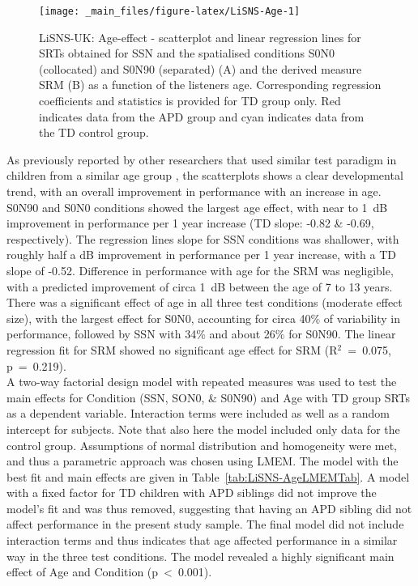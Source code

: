 \documentclass[a4paper, twoside]{templates/ociamthesis}
\begin{document}
\begin{figure}

{\centering \texttt{[image: \_main\_files/figure-latex/LiSNS-Age-1]} 

}

\caption{LiSNS-UK: Age-effect - scatterplot and linear regression lines for SRTs obtained for SSN and the spatialised conditions S0N0 (collocated) and S0N90 (separated) (A) and the derived measure SRM (B) as a function of the listeners age. Corresponding regression coefficients and statistics is provided for TD group only. Red indicates data from the APD group and cyan indicates data from the TD control group.}\label{fig:LiSNS-Age}
\end{figure}

As previously reported by other researchers that used similar test paradigm in children from a similar age group \autocites[e.g.,][]{Cameron2007,Murphy2019}, the scatterplots shows a clear developmental trend, with an overall improvement in performance with an increase in age. S0N90 and S0N0 conditions showed the largest age effect, with near to 1~dB improvement in performance per 1 year increase (TD slope: -0.82 \& -0.69, respectively). The regression lines slope for SSN conditions was shallower, with roughly half a dB improvement in performance per 1 year increase, with a TD slope of -0.52. Difference in performance with age for the SRM was negligible, with a predicted improvement of circa 1~dB between the age of 7 to 13 years. There was a significant effect of age in all three test conditions (moderate effect size), with the largest effect for S0N0, accounting for circa 40\% of variability in performance, followed by SSN with 34\% and about 26\% for S0N90. The linear regression fit for SRM showed no significant age effect for SRM (R\(^{2}\)~=~0.075, p~=~0.219).\\

A two-way factorial design model with repeated measures was used to test the main effects for Condition (SSN, SON0, \& S0N90) and Age with TD group SRTs as a dependent variable. Interaction terms were included as well as a random intercept for subjects. Note that also here the model included only data for the control group. Assumptions of normal distribution and homogeneity were met, and thus a parametric approach was chosen using LMEM. The model with the best fit and main effects are given in Table~\ref{tab:LiSNS-AgeLMEMTab}. A model with a fixed factor for TD children with APD siblings did not improve the model's fit and was thus removed, suggesting that having an APD sibling did not affect performance in the present study sample. The final model did not include interaction terms and thus indicates that age affected performance in a similar way in the three test conditions. The model revealed a highly significant main effect of Age and Condition (p~\textless~0.001).\\
\end{document}
